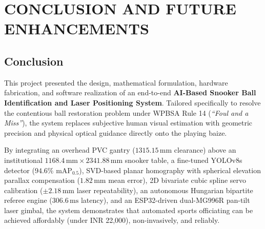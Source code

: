 \chapter{CONCLUSION AND FUTURE ENHANCEMENTS}

\section{Conclusion}
This project presented the design, mathematical formulation, hardware fabrication, and software realization of an end-to-end \textbf{AI-Based Snooker Ball Identification and Laser Positioning System}. Tailored specifically to resolve the contentious ball restoration problem under WPBSA Rule 14 (\textit{``Foul and a Miss''}), the system replaces subjective human visual estimation with geometric precision and physical optical guidance directly onto the playing baize.

By integrating an overhead PVC gantry ($1315.15\,\text{mm}$ clearance) above an institutional $1168.4\,\text{mm} \times 2341.88\,\text{mm}$ snooker table, a fine-tuned YOLOv8s detector ($94.6\%$ $\text{mAP}_{0.5}$), SVD-based planar homography with spherical elevation parallax compensation ($1.82\,\text{mm}$ mean error), 2D bivariate cubic spline servo calibration ($\pm 2.18\,\text{mm}$ laser repeatability), an autonomous Hungarian bipartite referee engine ($306.6\,\text{ms}$ latency), and an ESP32-driven dual-MG996R pan-tilt laser gimbal, the system demonstrates that automated sports officiating can be achieved affordably (under INR 22,000), non-invasively, and reliably.

